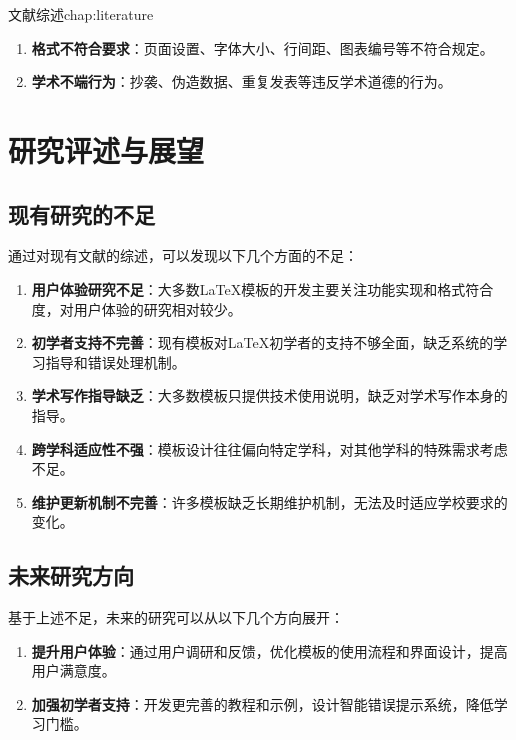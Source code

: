 \begin{cuzchapter}{文献综述}{chap:literature}
\begin{enumerate}
		\item \textbf{格式不符合要求}：页面设置、字体大小、行间距、图表编号等不符合规定。
		
		\item \textbf{学术不端行为}：抄袭、伪造数据、重复发表等违反学术道德的行为。
	\end{enumerate}
	
	\section{研究评述与展望}\label{sec:review-prospect}
	
	\subsection{现有研究的不足}
	
	通过对现有文献的综述，可以发现以下几个方面的不足：
	
	\begin{enumerate}
		\item \textbf{用户体验研究不足}：大多数\LaTeX{}模板的开发主要关注功能实现和格式符合度，对用户体验的研究相对较少。
		
		\item \textbf{初学者支持不完善}：现有模板对\LaTeX{}初学者的支持不够全面，缺乏系统的学习指导和错误处理机制。
		
		\item \textbf{学术写作指导缺乏}：大多数模板只提供技术使用说明，缺乏对学术写作本身的指导。
		
		\item \textbf{跨学科适应性不强}：模板设计往往偏向特定学科，对其他学科的特殊需求考虑不足。
		
		\item \textbf{维护更新机制不完善}：许多模板缺乏长期维护机制，无法及时适应学校要求的变化。
	\end{enumerate}
	
	\subsection{未来研究方向}
	
	基于上述不足，未来的研究可以从以下几个方向展开：
	
	\begin{enumerate}
		\item \textbf{提升用户体验}：通过用户调研和反馈，优化模板的使用流程和界面设计，提高用户满意度。
		
		\item \textbf{加强初学者支持}：开发更完善的教程和示例，设计智能错误提示系统，降低学习门槛。
		

\end{enumerate}
\end{cuzchapter}
